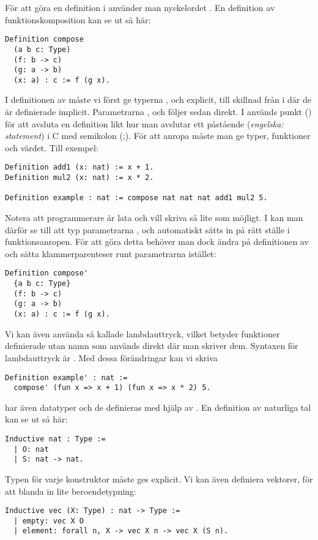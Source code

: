 För att göra en definition i \coq{} använder man nyckelordet . En
definition av funktionskomposition kan se ut så här:
\begin{lstlisting}
Definition compose
  (a b c: Type)
  (f: b -> c)
  (g: a -> b)
  (x: a) : c := f (g x).
\end{lstlisting}
I definitionen av  måste vi först ge typerna ,  och 
explicit, till skillnad från i \haskell{} där de är definierade implicit.
Parametrarna ,  och  följer sedan direkt. I \coq{} används punkt
() för att avsluta en definition likt hur man avslutar ett påstående
(\emph{engelska: statement}) i C med semikolon (;). För att anropa 
måste man ge typer, funktioner och värdet. Till exempel:
\begin{lstlisting}
Definition add1 (x: nat) := x + 1.
Definition mul2 (x: nat) := x * 2.

Definition example : nat := compose nat nat nat add1 mul2 5.
\end{lstlisting}
Notera att programmerare är lata och vill skriva så lite som möjligt. I
\coq{} kan man därför se till att typ parametrarna ,  och 
automatiskt sätts in på rätt ställe i funktionsanropen. För att göra detta
behöver man dock ändra på definitionen av  och sätta
klammerparenteser runt parametrarna istället:
\begin{lstlisting}
Definition compose'
  {a b c: Type}
  (f: b -> c)
  (g: a -> b)
  (x: a) : c := f (g x).
\end{lstlisting}
Vi kan även använda så kallade lambdauttryck, vilket betyder funktioner
definierade utan namn som används direkt där man skriver dem. Syntaxen för
lambdauttryck är . Med dessa förändringar kan
vi skriva
\begin{lstlisting}
Definition example' : nat :=
  compose' (fun x => x + 1) (fun x => x * 2) 5.
\end{lstlisting}
\coq{} har även datatyper och de definieras med hjälp av . En
definition av naturliga tal kan se ut så här:
\begin{lstlisting}
Inductive nat : Type :=
  | O: nat
  | S: nat -> nat.
\end{lstlisting}
Typen för varje konstruktor måste ges explicit. Vi kan även definiera vektorer, för
att blanda in lite beroendetypning:
\begin{lstlisting}
Inductive vec (X: Type) : nat -> Type :=
  | empty: vec X O
  | element: forall n, X -> vec X n -> vec X (S n).
\end{lstlisting}
